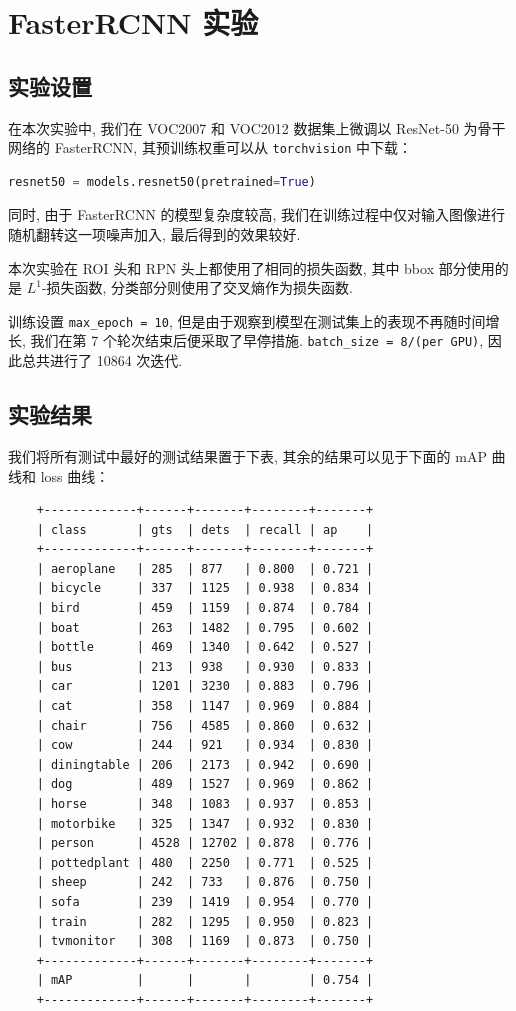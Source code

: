 \documentclass[notitlepage,cs4size,punct,oneside]{ctexrep}
\numberwithin{equation}{chapter}
\theoremstyle{mystyle}
\begin{document}
\section{FasterRCNN 实验}

\subsection{实验设置}
在本次实验中, 我们在 VOC2007 和 VOC2012 数据集上微调以 ResNet-50 为骨干网络的 FasterRCNN, 其预训练权重可以从 \lstinline|torchvision| 中下载：

\begin{lstlisting}[language=Python]
resnet50 = models.resnet50(pretrained=True)
\end{lstlisting}

同时, 由于 FasterRCNN 的模型复杂度较高, 我们在训练过程中仅对输入图像进行随机翻转这一项噪声加入, 最后得到的效果较好.

本次实验在 ROI 头和 RPN 头上都使用了相同的损失函数, 其中 bbox 部分使用的是 $L^{1}$-损失函数, 分类部分则使用了交叉熵作为损失函数.

训练设置 \lstinline|max_epoch = 10|, 但是由于观察到模型在测试集上的表现不再随时间增长, 我们在第 7 个轮次结束后便采取了早停措施. \lstinline|batch_size = 8/(per GPU)|, 因此总共进行了 10864 次迭代.
\subsection{实验结果}

我们将所有测试中最好的测试结果置于下表, 其余的结果可以见于下面的 mAP 曲线和 loss 曲线：

\begin{lstlisting}
    +-------------+------+-------+--------+-------+
    | class       | gts  | dets  | recall | ap    |
    +-------------+------+-------+--------+-------+
    | aeroplane   | 285  | 877   | 0.800  | 0.721 |
    | bicycle     | 337  | 1125  | 0.938  | 0.834 |
    | bird        | 459  | 1159  | 0.874  | 0.784 |
    | boat        | 263  | 1482  | 0.795  | 0.602 |
    | bottle      | 469  | 1340  | 0.642  | 0.527 |
    | bus         | 213  | 938   | 0.930  | 0.833 |
    | car         | 1201 | 3230  | 0.883  | 0.796 |
    | cat         | 358  | 1147  | 0.969  | 0.884 |
    | chair       | 756  | 4585  | 0.860  | 0.632 |
    | cow         | 244  | 921   | 0.934  | 0.830 |
    | diningtable | 206  | 2173  | 0.942  | 0.690 |
    | dog         | 489  | 1527  | 0.969  | 0.862 |
    | horse       | 348  | 1083  | 0.937  | 0.853 |
    | motorbike   | 325  | 1347  | 0.932  | 0.830 |
    | person      | 4528 | 12702 | 0.878  | 0.776 |
    | pottedplant | 480  | 2250  | 0.771  | 0.525 |
    | sheep       | 242  | 733   | 0.876  | 0.750 |
    | sofa        | 239  | 1419  | 0.954  | 0.770 |
    | train       | 282  | 1295  | 0.950  | 0.823 |
    | tvmonitor   | 308  | 1169  | 0.873  | 0.750 |
    +-------------+------+-------+--------+-------+
    | mAP         |      |       |        | 0.754 |
    +-------------+------+-------+--------+-------+
\end{lstlisting}
\end{document}
